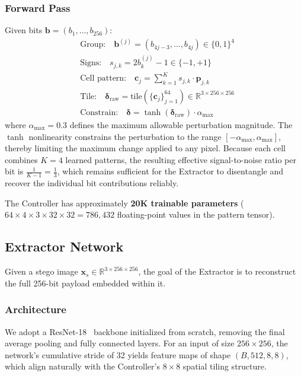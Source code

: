 \documentclass[conference]{IEEEtran}
\newcommand{\R}{\mathbb{R}}
\begin{document}
\subsubsection{Forward Pass}
Given bits $\mathbf{b} = (b_1, \ldots, b_{256})$:
\begin{align}
    &\text{Group:} \quad \mathbf{b}^{(j)} = (b_{4j-3}, \ldots, b_{4j}) \in \{0,1\}^4 \label{eq:group} \\
    &\text{Signs:} \quad s_{j,k} = 2 b^{(j)}_k - 1 \in \{-1, +1\} \label{eq:signs} \\
    &\text{Cell pattern:} \quad \mathbf{c}_j = \sum_{k=1}^{K} s_{j,k} \cdot \mathbf{p}_{j,k} \label{eq:cell} \\
    &\text{Tile:} \quad \bm{\delta}_\text{raw} = \text{tile}(\{\mathbf{c}_j\}_{j=1}^{64}) \in \R^{3 \times 256 \times 256} \label{eq:tile} \\
    &\text{Constrain:} \quad \bm{\delta} = \tanh(\bm{\delta}_\text{raw}) \cdot \alpha_\text{max} \label{eq:constrain}
\end{align}
where $\alpha_{\text{max}} = 0.3$ defines the maximum allowable perturbation magnitude.
The $\tanh$ nonlinearity constrains the perturbation to the range $[-\alpha_{\text{max}}, \alpha_{\text{max}}]$, thereby limiting the maximum change applied to any pixel.
Because each cell combines $K = 4$ learned patterns, the resulting effective signal-to-noise ratio per bit is $\frac{1}{K-1} = \frac{1}{3}$, which remains sufficient for the Extractor to disentangle and recover the individual bit contributions reliably.

The Controller has approximately \textbf{20K trainable parameters} ($64 \times 4 \times 3 \times 32 \times 32 = 786{,}432$ floating-point values in the pattern tensor).

\subsection{Extractor Network}
\label{sec:extractor}

Given a stego image $\mathbf{x}_s \in \R^{3 \times 256 \times 256}$, the goal of the Extractor is to reconstruct the full 256-bit payload embedded within it.

\subsubsection{Architecture}
We adopt a ResNet-18~\cite{he2016deep} backbone initialized from scratch, removing the final average pooling and fully connected layers.
For an input of size $256 \times 256$, the network’s cumulative stride of 32 yields feature maps of shape $(B, 512, 8, 8)$, which align naturally with the Controller’s $8\times8$ spatial tiling structure.
\end{document}
